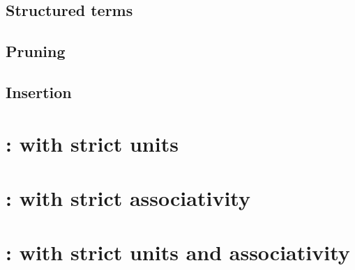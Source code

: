 \documentclass{cam-thesis}
\begin{document}
\section{Structured terms}
\label{sec:structured-terms}

\section{Pruning}
\label{sec:pruning}

\section{Insertion}
\label{sec:insertion}

\chapter{\Cattsu : \Catt with strict units}
\label{cha:cattsu}

\chapter{\Cattsa : \Catt with strict associativity}
\label{cha:cattsa}

\chapter{\Cattsua : \Catt with strict units and associativity}
\label{cha:cattsua}


















\printbibliography
\end{document}
